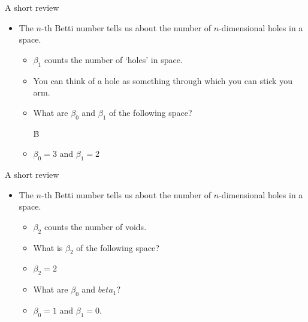 \documentclass[handout]{beamer}
\begin{document}
\begin{frame}{A short review}
\begin{itemize}
\item The $n$-th Betti number tells us about the number of $n$-dimensional holes in a space.
	\begin{itemize}
	\item<1-> $\beta_1$ counts the number of `holes' in space.
	\item<2-> You can think of a hole as something through which you can stick you arm.
	\item<3-> What are $\beta_0$ and $\beta_1$ of the following space?
	\begin{center}
	{\fontsize{50pt}{12pt}\selectfont \"{B}}
	\end{center}	
	\item<4-> $\beta_0 = 3$ and $\beta_1 = 2$
	\end{itemize}
\end{itemize}
\end{frame}
\begin{frame}{A short review}
\begin{itemize}
\item The $n$-th Betti number tells us about the number of $n$-dimensional holes in a space.
	\begin{itemize}
	\item<2-> $\beta_2$ counts the number of voids.
	\item<3-> What is $\beta_2$ of the following space?
	\item<4-> $\beta_2 = 2$
	\item<5-> What are $\beta_0$ and $beta_1$?
	\item<6-> $\beta_0 = 1$ and $\beta_1 = 0$.
	\end{itemize}
\end{itemize}
\end{frame}
\end{document}
